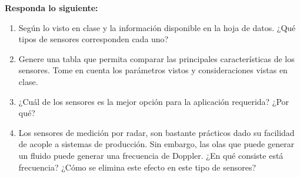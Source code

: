 \documentclass[12pt]{article}
\begin{document}
\noindent\textbf{Responda lo siguiente:}

\begin{enumerate}
    \item Según lo visto en clase y la información disponible en la hoja de datos. ¿Qué tipos de sensores corresponden cada uno?
    \item Genere una tabla que permita comparar las principales características de los sensores. Tome en cuenta los parámetros vistos y consideraciones vistas en clase.
    \item ¿Cuál de los sensores es la mejor opción para la aplicación requerida? ¿Por qué?
    \item Los sensores de medición por radar, son bastante prácticos dado su facilidad de acople a sistemas de producción. Sin embargo, las olas que puede generar un fluido puede generar una frecuencia de Doppler. ¿En qué consiste está frecuencia? ¿Cómo se elimina este efecto en este tipo de sensores?
\end{enumerate}
\end{document}
